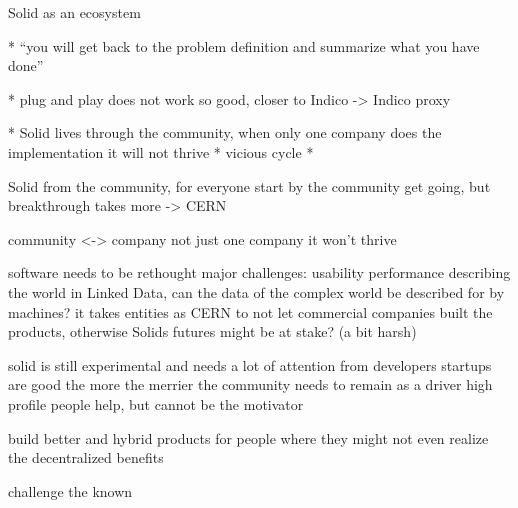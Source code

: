 \vspace{1cm}

Solid as an ecosystem



\vspace{3cm}

* “you will get back to the problem definition and summarize what you have done”

* plug and play does not work so good, closer to Indico -> Indico proxy

* Solid lives through the community, when only one company does the implementation it will not thrive
* vicious cycle
* 

Solid from the community, for everyone
start by the community
get going, but breakthrough takes more -> CERN

community <-> company
not just one company it won't thrive

software needs to be rethought
major challenges:
    usability
    performance
    describing the world in Linked Data, can the data of the complex world be described for by machines?
it takes entities as CERN to not let commercial companies built the products, otherwise Solids futures might be at stake? (a bit harsh)

solid is still experimental and needs a lot of attention from developers
startups are good
the more the merrier
the community needs to remain as a driver
high profile people help, but cannot be the motivator

build better and hybrid products for people where they might not even realize the decentralized benefits

challenge the known